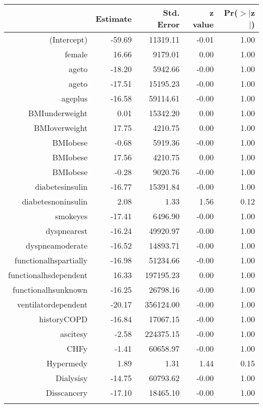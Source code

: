 \bigskip\bigskip
\centering
\begin{tabular}{rrrrr}
  \hline
 & Estimate & Std. Error & z value & Pr($>$$|$z$|$) \\ 
  \hline
(Intercept) & -59.69 & 11319.11 & -0.01 & 1.00 \\ 
  female & 16.66 & 9179.01 & 0.00 & 1.00 \\ 
  age\-65\-to\-74 & -18.20 & 5942.66 & -0.00 & 1.00 \\ 
  age\-75\-to\-84 & -17.51 & 15195.23 & -0.00 & 1.00 \\ 
  age\-85\-plus & -16.58 & 59114.61 & -0.00 & 1.00 \\ 
  BMI\-underweight & 0.01 & 15342.20 & 0.00 & 1.00 \\ 
  BMI\-overweight & 17.75 & 4210.75 & 0.00 & 1.00 \\ 
  BMI\-obese\-1 & -0.68 & 5919.36 & -0.00 & 1.00 \\ 
  BMI\-obese\-2 & 17.56 & 4210.75 & 0.00 & 1.00 \\ 
  BMI\-obese\-3 & -0.28 & 9020.76 & -0.00 & 1.00 \\ 
  diabetes\-insulin & -16.77 & 15391.84 & -0.00 & 1.00 \\ 
  diabetes\-noninsulin & 2.08 & 1.33 & 1.56 & 0.12 \\ 
  smoke\-yes & -17.41 & 6496.90 & -0.00 & 1.00 \\ 
  dyspnea\-rest & -16.24 & 49920.97 & -0.00 & 1.00 \\ 
  dyspnea\-moderate & -16.52 & 14893.71 & -0.00 & 1.00 \\ 
  functional\-hs\-partially & -16.98 & 51234.66 & -0.00 & 1.00 \\ 
  functional\-hs\-dependent & 16.33 & 197195.23 & 0.00 & 1.00 \\ 
  functional\-hs\-unknown & -16.25 & 26798.16 & -0.00 & 1.00 \\ 
  ventilator\-dependent & -20.17 & 356124.00 & -0.00 & 1.00 \\ 
  history\-COPD & -16.84 & 17067.15 & -0.00 & 1.00 \\ 
  ascites\-y & -2.58 & 224375.15 & -0.00 & 1.00 \\ 
  CHF\-y & -1.41 & 60658.97 & -0.00 & 1.00 \\ 
  Hyper\-med\-y & 1.89 & 1.31 & 1.44 & 0.15 \\ 
  Dialysis\-y & -14.75 & 60793.62 & -0.00 & 1.00 \\ 
  Diss\-cancer\-y & -17.10 & 18465.10 & -0.00 & 1.00 \\ 
$$
\end{tabular}
